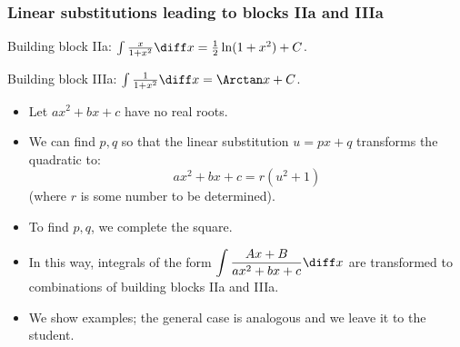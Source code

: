 \begin{frame}
\frametitle{Linear substitutions leading to blocks IIa and IIIa}
Building block IIa: \alert<4>{$ \int \frac{x}{1+x^2}\diff x = \frac{1}{2}\ln(1+x^2)+C$}.

Building block IIIa: \alert<4>{$\int \frac{1}{1+x^2 }\diff x=\Arctan x+C$}.

\begin{itemize}

\item<1-> Let $ax^2+bx+c$ have no real roots.
\item<2-> We can find $p,q$ so that the linear substitution $u=px+q$ transforms the quadratic to:
\[
ax^2+bx+c= r(u^2+1)
\] 
(where $r$ is some number to be determined).
\item<3-> To find $p,q$, we \alert<3>{complete the square}. 
\item<4-> In this way, integrals of the form \alert<4>{$\displaystyle \int \frac{Ax+B}{ax^2+bx+c} \diff x$} are transformed to \alert<4>{combinations of building blocks IIa and IIIa}.

\item<5-> We show examples; the general case is analogous and we leave it to the student.
\end{itemize}
\vspace{5cm}
\end{frame}


